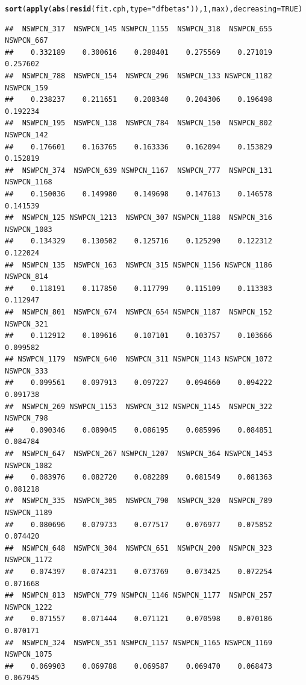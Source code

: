 \documentclass{article}\usepackage[]{graphicx}\usepackage[]{color}
\makeatletter
\newcommand{\hlnum}[1]{\textcolor[rgb]{0.686,0.059,0.569}{#1}}%
\newcommand{\hlstr}[1]{\textcolor[rgb]{0.192,0.494,0.8}{#1}}%
\newcommand{\hlstd}[1]{\textcolor[rgb]{0.345,0.345,0.345}{#1}}%
\newcommand{\hlkwc}[1]{\textcolor[rgb]{0.333,0.667,0.333}{#1}}%
\newcommand{\hlkwd}[1]{\textcolor[rgb]{0.737,0.353,0.396}{\textbf{#1}}}%
\newenvironment{kframe}{%
 \def\at@end@of@kframe{}%
 \ifinner\ifhmode%
  \def\at@end@of@kframe{\end{minipage}}%
  \begin{minipage}{\columnwidth}%
 \fi\fi%
 \def\FrameCommand##1{\hskip\@totalleftmargin \hskip-\fboxsep
 \colorbox{shadecolor}{##1}\hskip-\fboxsep
     \hskip-\linewidth \hskip-\@totalleftmargin \hskip\columnwidth}%
 \MakeFramed {\advance\hsize-\width
   \@totalleftmargin\z@ \linewidth\hsize
   \@setminipage}}%
 {\par\unskip\endMakeFramed%
 \at@end@of@kframe}
\newenvironment{knitrout}{}{} %
\makeatother
\begin{document}
\begin{knitrout}
{}


\begin{kframe}\begin{alltt}
\hlkwd{sort}\hlstd{(}\hlkwd{apply}\hlstd{(}\hlkwd{abs}\hlstd{(}\hlkwd{resid}\hlstd{(fit.cph,} \hlkwc{type} \hlstd{=} \hlstr{"dfbetas"}\hlstd{)),} \hlnum{1}\hlstd{, max),} \hlkwc{decreasing} \hlstd{=} \hlnum{TRUE}\hlstd{)}
\end{alltt}
\begin{verbatim}
##  NSWPCN_317  NSWPCN_145 NSWPCN_1155  NSWPCN_318  NSWPCN_655  NSWPCN_667 
##    0.332189    0.300616    0.288401    0.275569    0.271019    0.257602 
##  NSWPCN_788  NSWPCN_154  NSWPCN_296  NSWPCN_133 NSWPCN_1182  NSWPCN_159 
##    0.238237    0.211651    0.208340    0.204306    0.196498    0.192234 
##  NSWPCN_195  NSWPCN_138  NSWPCN_784  NSWPCN_150  NSWPCN_802  NSWPCN_142 
##    0.176601    0.163765    0.163336    0.162094    0.153829    0.152819 
##  NSWPCN_374  NSWPCN_639 NSWPCN_1167  NSWPCN_777  NSWPCN_131 NSWPCN_1168 
##    0.150036    0.149980    0.149698    0.147613    0.146578    0.141539 
##  NSWPCN_125 NSWPCN_1213  NSWPCN_307 NSWPCN_1188  NSWPCN_316 NSWPCN_1083 
##    0.134329    0.130502    0.125716    0.125290    0.122312    0.122024 
##  NSWPCN_135  NSWPCN_163  NSWPCN_315 NSWPCN_1156 NSWPCN_1186  NSWPCN_814 
##    0.118191    0.117850    0.117799    0.115109    0.113383    0.112947 
##  NSWPCN_801  NSWPCN_674  NSWPCN_654 NSWPCN_1187  NSWPCN_152  NSWPCN_321 
##    0.112912    0.109616    0.107101    0.103757    0.103666    0.099582 
## NSWPCN_1179  NSWPCN_640  NSWPCN_311 NSWPCN_1143 NSWPCN_1072  NSWPCN_333 
##    0.099561    0.097913    0.097227    0.094660    0.094222    0.091738 
##  NSWPCN_269 NSWPCN_1153  NSWPCN_312 NSWPCN_1145  NSWPCN_322  NSWPCN_798 
##    0.090346    0.089045    0.086195    0.085996    0.084851    0.084784 
##  NSWPCN_647  NSWPCN_267 NSWPCN_1207  NSWPCN_364 NSWPCN_1453 NSWPCN_1082 
##    0.083976    0.082720    0.082289    0.081549    0.081363    0.081218 
##  NSWPCN_335  NSWPCN_305  NSWPCN_790  NSWPCN_320  NSWPCN_789 NSWPCN_1189 
##    0.080696    0.079733    0.077517    0.076977    0.075852    0.074420 
##  NSWPCN_648  NSWPCN_304  NSWPCN_651  NSWPCN_200  NSWPCN_323 NSWPCN_1172 
##    0.074397    0.074231    0.073769    0.073425    0.072254    0.071668 
##  NSWPCN_813  NSWPCN_779 NSWPCN_1146 NSWPCN_1177  NSWPCN_257 NSWPCN_1222 
##    0.071557    0.071444    0.071121    0.070598    0.070186    0.070171 
##  NSWPCN_324  NSWPCN_351 NSWPCN_1157 NSWPCN_1165 NSWPCN_1169 NSWPCN_1075 
##    0.069903    0.069788    0.069587    0.069470    0.068473    0.067945 

\end{verbatim}
\end{kframe}
\end{knitrout}
\end{document}
